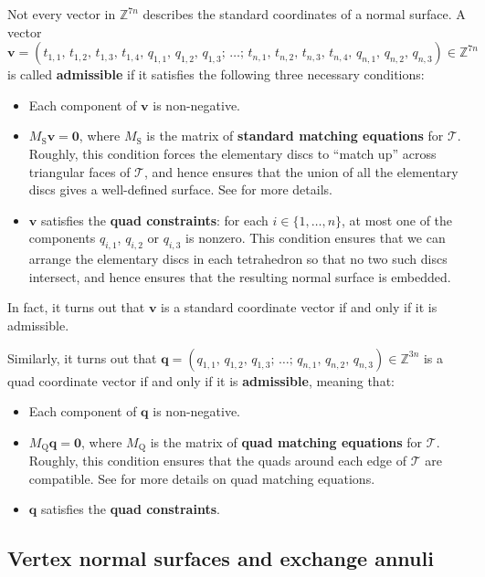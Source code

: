 \documentclass[10pt,a4paper]{amsart}
\newcommand{\tri}{\mathcal{T}}
\begin{document}
Not every vector in $\mathbb{Z}^{7n}$ describes the standard coordinates of a normal surface.
A vector
\[
\mathbf{v} =
( t_{1,1},\, t_{1,2},\, t_{1,3},\, t_{1,4},\,
q_{1,1},\, q_{1,2},\, q_{1,3};\,
\ldots;\,
t_{n,1},\, t_{n,2},\, t_{n,3},\, t_{n,4},\,
q_{n,1},\, q_{n,2},\, q_{n,3} )
\in \mathbb{Z}^{7n}
\]
is called \textbf{admissible} if it satisfies the following three necessary conditions:
\begin{itemize}
\item
Each component of $\mathbf{v}$ is non-negative.
\item
$M_\mathrm{S}\mathbf{v} = \mathbf{0}$, where $M_\mathrm{S}$ is the matrix of \textbf{standard matching equations} for $\tri$.
Roughly, this condition forces the elementary discs to ``match up'' across triangular faces of $\tri$,
and hence ensures that the union of all the elementary discs gives a well-defined surface. See \cite{hass1999computational} for more details.
\item
$\mathbf{v}$ satisfies the \textbf{quad constraints}:
for each $i\in\{1,\ldots,n\}$, at most one of the components $q_{i,1}$, $q_{i,2}$ or $q_{i,3}$ is nonzero.
This condition ensures that we can arrange the elementary discs in each tetrahedron so that
no two such discs intersect, and hence ensures that the resulting normal surface is embedded.
\end{itemize}
In fact, it turns out that $\mathbf{v}$ is a standard coordinate vector if and only if it is admissible.

Similarly, it turns out that
$
\mathbf{q} =
( q_{1,1},\, q_{1,2},\, q_{1,3};\,
\ldots;\,
q_{n,1},\, q_{n,2},\, q_{n,3} )
\in \mathbb{Z}^{3n}
$
is a quad coordinate vector if and only if it is \textbf{admissible}, meaning that:
\begin{itemize}
\item
Each component of $\mathbf{q}$ is non-negative.
\item
$M_\mathrm{Q}\mathbf{q} = \mathbf{0}$, where $M_\mathrm{Q}$ is the matrix of \textbf{quad matching equations} for $\tri$.
Roughly, this condition ensures that the quads around each edge of $\tri$ are compatible.
See \cite{Burton09Converting} for more details on quad matching equations.
\item
$\mathbf{q}$ satisfies the \textbf{quad constraints}.
\end{itemize}

\subsection{Vertex normal surfaces and exchange annuli}
\label{ssec:vertexAndExchange}
\end{document}
